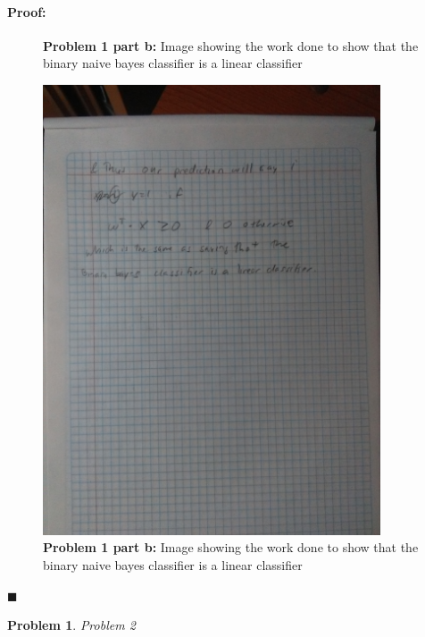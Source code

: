 \documentclass[12pt]{article}
\newenvironment{proof}{\paragraph{Proof: }}{\hfill$\blacksquare$}
\newtheorem{problem}{Problem}%
\begin{document}
\begin{proof}
\begin{enumerate}
\begin{figure}[!htbp]
\caption{\textbf{Problem 1 part b:} Image showing the work done to show that the binary naive bayes classifier is a linear classifier}
\end{figure} 
\begin{figure}[!htbp]
\centering
\includegraphics[width=10cm]{hw3_prob1b_3.jpg}
\caption{\textbf{Problem 1 part b:} Image showing the work done to show that the binary naive bayes classifier is a linear classifier}
\end{figure} 

\end{enumerate}

\end{proof}

\begin{problem}
\normalfont
Problem 2
\end{problem}
\end{document}
